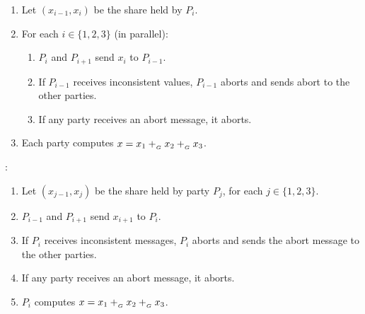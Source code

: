 \begin{protocol}[Output]
	\begin{enumerate}
		\item Let $(x_{i-1}, x_i)$ be the share held by $P_i$.
		\item For each $i \in \{1, 2, 3\}$ (in parallel):
			\begin{enumerate}
				\item $P_i$ and $P_{i+1}$ send $x_i$ to $P_{i-1}$.
				\item If $P_{i-1}$ receives inconsistent values,
					$P_{i-1}$ aborts and sends abort to
					the other parties.
				\item If any party receives an abort message, it aborts.
			\end{enumerate}
		\item Each party computes $x = x_1 +_{_G} x_2 +_{_G} x_3$.
	\end{enumerate}

	\noindent	{}:
	\begin{enumerate}
		\item Let $(x_{j-1}, x_j)$ be the share held by party $P_j$,
			for each $j \in \{1, 2, 3\}$.
		\item $P_{i-1}$ and $P_{i+1}$ send $x_{i+1}$ to $P_i$.
		\item If $P_i$ receives inconsistent messages, $P_i$ aborts
			and sends the abort message to the other parties.
		\item If any party receives an abort message, it aborts.
		\item $P_i$ computes $x = x_1 +_{_G} x_2 +_{_G} x_3$.
	\end{enumerate}
\end{protocol}



